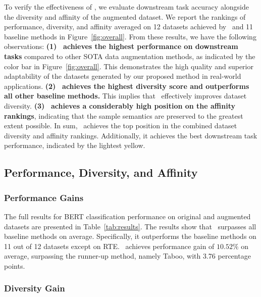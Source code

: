 To verify the effectiveness of \Methodnamec, we evaluate downstream task accuracy alongside the diversity and affinity of the augmented dataset. 
We report the rankings of performance, diversity, and affinity averaged on 12 datasets achieved by \Methodnamec~and 11 baseline methods in Figure~\ref{fig:overall}. 
From these results, we have the following observations: 
\textbf{(1)} \textbf{\Methodnamea~achieves the highest performance on downstream tasks} compared to other SOTA data augmentation methods, as indicated by the color bar in Figure~\ref{fig:overall}. 
This demonstrates the high quality and superior adaptability of the datasets generated by our proposed method in real-world applications. 
\textbf{(2)} \textbf{\Methodnamea~achieves the highest diversity score and outperforms all other baseline methods.} This implies that \Methodnamea~effectively improves dataset diversity. 
\textbf{(3)} \textbf{\Methodnamea~achieves a considerably high position on the affinity rankings}, indicating that the sample semantics are preserved to the greatest extent possible. 
In sum, \Methodnamea~achieves the top position in the combined dataset diversity and affinity rankings. 
Additionally, it achieves the best downstream task performance, indicated by the lightest yellow. 






\subsection{Performance, Diversity, and Affinity}

\subsubsection{Performance Gains}

The full results for BERT classification performance on original and augmented datasets are presented in Table~\ref{tab:results}. The results show that \Methodnamec~surpasses all baseline methods on average. Specifically, it outperforms the baseline methods on 11 out of 12 datasets except on RTE. \Methodnamea~achieves performance gain of \(10.52\%\) on average, surpassing the runner-up method, namely Taboo, with 3.76 percentage points. 

\vspace{-1.5mm}
\subsubsection{Diversity Gain}
\vspace{-1.5mm}


